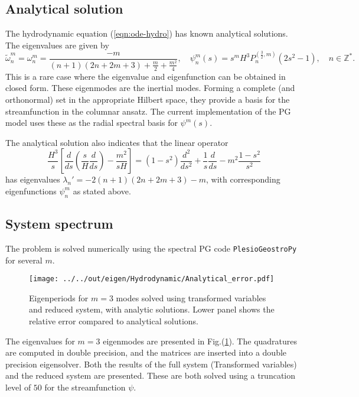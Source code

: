 \subsection{Analytical solution}

The hydrodynamic equation (\ref{eqn:ode-hydro}) has known analytical solutions. The eigenvalues are given by
\begin{equation}
    \widetilde{\omega}_n^m = \omega_n^m = \frac{-m}{(n + 1)(2n + 2m + 3) + \frac{m}{2} + \frac{m^2}{4}}, \quad 
    \psi^{m}_n(s) = s^m H^3 P_{n}^{\left(\frac{3}{2}, m\right)}(2s^2 - 1),\quad n \in \mathbb{Z}^*.
\end{equation}
This is a rare case where the eigenvalue and eigenfunction can be obtained in closed form.
These eigenmodes are the inertial modes. Forming a complete (and orthonormal) set in the appropriate Hilbert space, they provide a basis for the streamfunction in the columnar ansatz. The current implementation of the PG model uses these as the radial spectral basis for $\psi^m(s)$.

The analytical solution also indicates that the linear operator
\[
    \frac{H^3}{s} \left[\frac{d}{ds}\left(\frac{s}{H} \frac{d}{ds}\right) - \frac{m^2}{sH}\right] = (1 - s^2) \frac{d^2}{ds^2} + \frac{1}{s}\frac{d}{ds} - m^2 \frac{1 - s^2}{s^2}
\]
has eigenvalues $\lambda_n' = - 2(n+1)(2n+2m+3) - m$, with corresponding eigenfunctions $\psi_n^m$ as stated above.

\subsection{System spectrum}

The problem is solved numerically using the spectral PG code \texttt{PlesioGeostroPy} for several $m$.
\begin{figure}[htbp]
    \centering
    \texttt{[image: ../../out/eigen/Hydrodynamic/Analytical\_error.pdf]}
    \caption{Eigenperiods for $m=3$ modes solved using transformed variables and reduced system, with analytic solutions. Lower panel shows the relative error compared to analytical solutions.}
    \label{fig:eigenperiod-hydro-m3}
\end{figure}

The eigenvalues for $m=3$ eigenmodes are presented in Fig.(\ref{fig:eigenperiod-hydro-m3}). The quadratures are computed in double precision, and the matrices are inserted into a double precision eigensolver.
Both the results of the full system (Transformed variables) and the reduced system are presented. These are both solved using a truncation level of $50$ for the streamfunction $\psi$.

